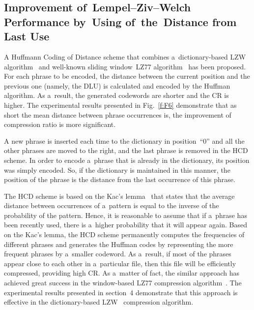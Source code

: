 \begin{multicols}{2}
\section{Improvement of~Lempel--Ziv--Welch 
Performance by~Using of~the~Distance from Last Use}


\noindent
A Huffmann Coding of Distance scheme that combines 
a~dictionary-based LZW algorithm~\cite{W84} and well-known sliding 
window~{LZ77} algorithm~\cite{ZL77} has been proposed.  
For each phrase to be encoded, the distance between the current position and the previous one (namely, the 
DLU) is calculated and  encoded by the Huffman algorithm. As a~result,
the generated codewords are shorter and the CR is higher. The experimental 
results presented in Fig.~\ref{f:F6} demonstrate that as short the mean distance between phrase occurrences is, the improvement of 
compression  ratio is more significant.

A new phrase is inserted  each time  to the dictionary in position~``0'' and all 
the other phrases are moved to the right, and the last phrase is removed in the HCD 
scheme.
In order to encode a~phrase that is already in the dictionary, 
its position was simply encoded. So, if the dictionary is maintained in this manner, the position of 
the phrase is the distance from the last occurrence of this phrase.

The HCD scheme is based on the Kac's lemma~\cite{K47} that states that 
the average distance between occurrences of a~pattern is equal to the inverse 
of the probability of the pattern. Hence, it is reasonable to assume that if 
a~phrase has been recently used, there is a~higher probability that it will 
appear again. Based on the Kac's lemma,  the {HCD} scheme permanently 
computes the frequencies of different phrases and generates the Huffman codes 
by representing the more frequent phrases by a~smaller codeword.
As a~result, if most of the phrases appear close to each other in a~particular 
file, then this file will be efficiently compressed, providing high CR. 
As a~matter of fact, the similar approach has achieved great success in the 
window-based LZ77 compression algorithm~\cite{ZL77}. The experimental results  
presented 
in section~4 demonstrate that this approach is effective in the dictionary-based 
LZW~\cite{W84} compression algorithm.


\end{multicols}

